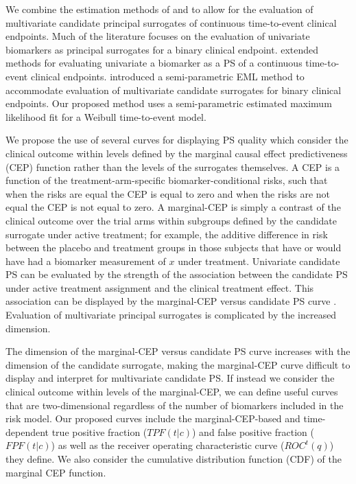 \documentclass[times, doublespace]{simauth}
\begin{document}
We combine the estimation methods of \citet{Gabriel13} and  \citet{Huang11}  to allow for the evaluation of multivariate candidate principal surrogates of continuous time-to-event clinical endpoints. Much of the literature focuses on the evaluation of univariate biomarkers as principal surrogates for a binary clinical endpoint. \citet{Gabriel13} extended methods for evaluating univariate a biomarker as a PS of a continuous time-to-event clinical endpoints. \citet{Huang11} introduced a semi-parametric EML method to accommodate evaluation of multivariate candidate surrogates for binary clinical endpoints.  Our proposed method uses a semi-parametric estimated maximum likelihood fit for a Weibull time-to-event model. 

We propose the use of several curves for displaying PS quality which consider the clinical outcome within levels defined by the marginal causal effect predictiveness (CEP) function rather than the levels of the surrogates themselves. A CEP is a function of the treatment-arm-specific biomarker-conditional risks, such that when the risks are equal the CEP is equal to zero and when the risks are not equal the CEP is not equal to zero. A marginal-CEP is simply a contrast of the clinical outcome over the trial arms within subgroups defined by the candidate surrogate under active treatment; for example, the additive difference in risk between the placebo and treatment groups in those subjects that have or would have had a biomarker measurement of $x$ under treatment. Univariate candidate PS can be evaluated by the strength of the association between the candidate PS under active treatment assignment and the clinical treatment effect. This association can be displayed by the marginal-CEP versus candidate PS curve \citep{Gilbert08}. Evaluation of multivariate principal surrogates is complicated by the increased dimension.  


The dimension of the marginal-CEP versus candidate PS curve increases with the dimension of the candidate surrogate, making the marginal-CEP curve difficult to display and interpret for multivariate candidate PS. If instead we consider the clinical outcome within levels of the marginal-CEP, we can define useful curves that are two-dimensional regardless of the number of biomarkers included in the risk model. Our proposed curves include the marginal-CEP-based and time-dependent true positive fraction ($TPF(t|c)$) and false positive fraction ($FPF(t|c)$) as well as the receiver operating characteristic curve ($ROC^{t}(q)$) they define. We also consider the cumulative distribution function (CDF) of the marginal CEP function. 
\end{document}
